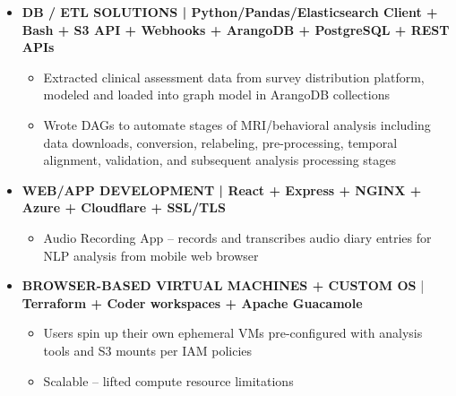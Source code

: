 \documentclass[10pt,a4paper,ragged2e]{altacv}
\begin{document}
\begin{fullwidth}
\begin{itemize}[label={}]
    \item \textbf{DB / ETL SOLUTIONS | Python/Pandas/Elasticsearch Client + Bash + S3 API + Webhooks + ArangoDB + PostgreSQL + REST APIs } 
        \begin{itemize}[label={-},noitemsep]
            \item Extracted clinical assessment data from survey distribution platform, modeled and loaded into graph model in ArangoDB collections
            \item Wrote DAGs to automate stages of MRI/behavioral analysis including data downloads, conversion, relabeling, pre-processing, temporal alignment, validation, and subsequent analysis processing stages
        \end{itemize}
        
    \item \textbf{WEB/APP DEVELOPMENT | React + Express + NGINX + Azure + Cloudflare + SSL/TLS}
        \begin{itemize}[label={-}, noitemsep]
            \item Audio Recording App -- records and transcribes audio diary entries for NLP analysis from mobile web browser
        
    \end{itemize}
    
    \item \textbf{BROWSER-BASED VIRTUAL MACHINES + CUSTOM OS} | \textbf{Terraform + Coder workspaces + Apache Guacamole}
        \begin{itemize}[label={-}, noitemsep]
            \item Users spin up their own ephemeral VMs pre-configured with analysis tools and S3 mounts per IAM policies
            \item Scalable -- lifted compute resource limitations
        \end{itemize}


\end{itemize}
\end{fullwidth}
\end{document}
